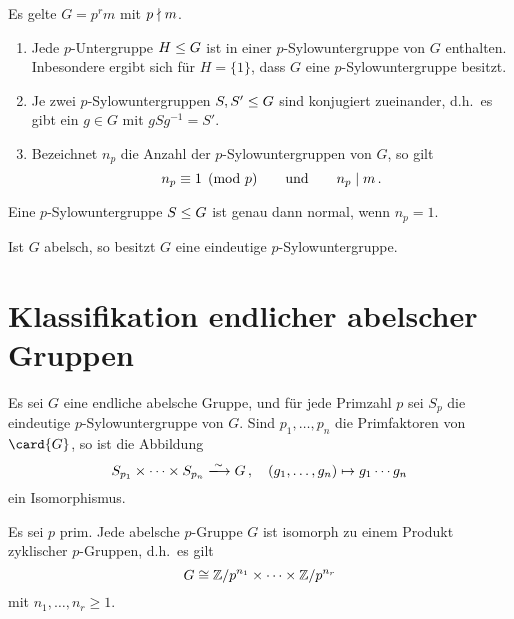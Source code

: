 \begin{theorem}[Sylowsätze]
  Es gelte $G = p^r m$ mit $p \mathrel{\nmid} m$.
  \begin{enumerate}
    \item
      Jede $p$-Untergruppe $H \mathrel{\leq} G$ ist in einer $p$-Sylowuntergruppe von $G$ enthalten.
      Inbesondere ergibt sich für $H = \{1\}$, dass $G$ eine $p$-Sylowuntergruppe besitzt.
    \item
      Je zwei $p$-Sylowuntergruppen $S, S' \mathrel{\leq} G$ sind konjugiert zueinander, d.h.\ es gibt ein $g \in G$ mit $g S g^{-1} = S'$.
    \item
      Bezeichnet $n_p$ die Anzahl der $p$-Sylowuntergruppen von $G$, so gilt
      \[
                n_p
        \equiv  1
        \pmod{p}
        \qquad\text{und}\qquad
        n_p \mathrel{|} m \,.
      \]
  \end{enumerate}
\end{theorem}

\begin{corollary}
  Eine $p$-Sylowuntergruppe $S \mathrel{\leq} G$ ist genau dann normal, wenn $n_p = 1$.
\end{corollary}

\begin{corollary}
  Ist $G$ abelsch, so besitzt $G$ eine eindeutige $p$-Sylowuntergruppe.
\end{corollary}





\section{Klassifikation endlicher abelscher Gruppen}


\begin{theorem}
  Es sei $G$ eine endliche abelsche Gruppe, und für jede Primzahl $p$ sei $S_p$ die eindeutige $p$-Sylowuntergruppe von $G$.
  Sind $p_1, \dotsc, p_n$ die Primfaktoren von $\card{G}$, so ist die Abbildung
  \[
                            S_{p_1} \times \dotsb \times S_{p_n}
    \xlongrightarrow{\sim}  G \,,
    \quad                   (g_1, \dotsc, g_n)
    \mapsto                 g_1 \dotsm g_n
  \]
  ein Isomorphismus.
\end{theorem}

\begin{proposition}
  Es sei $p$ prim.
  Jede abelsche $p$-Gruppe $G$ ist isomorph zu einem Produkt zyklischer $p$-Gruppen, d.h.\ es gilt
  \[
          G
    \cong \mathbb{Z}/p^{n_1} \times \dotsm \times \mathbb{Z}/p^{n_r}
  \]
  mit $n_1, \dotsc, n_r \geq 1$.
\end{proposition}

